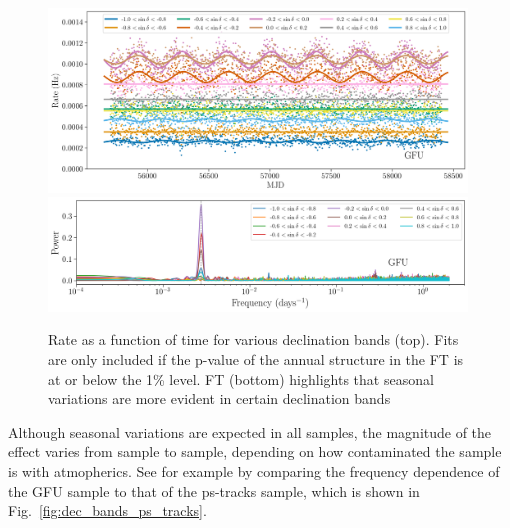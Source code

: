 \begin{figure}
    \centering
    \includegraphics[width=0.99\textwidth]{figures/seasonal/gfu_online_dec_band_with_model.png}
    \includegraphics[width=0.99\textwidth]{figures/seasonal/gfu_online_dec_bands_FFT.png}
    \caption[\texttt{GFU} seasonal variations]{Rate as a function of time for various declination bands (top). Fits are only included if the p-value of the annual structure in the FT is at or below the 1\% level. FT (bottom) highlights that seasonal variations are more evident in certain declination bands}
    \label{fig:dec_bands}
\end{figure}

Although seasonal variations are expected in all samples, the magnitude of the effect varies from sample to sample, depending on how contaminated the sample is with atmopherics. See for example by comparing the frequency dependence of the GFU sample to that of the ps-tracks sample, which is shown in Fig.~\ref{fig:dec_bands_ps_tracks}.

